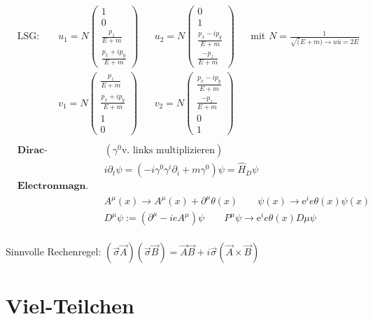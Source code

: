 \documentclass[10pt,a4paper,notitlepage]{scrartcl}
\begin{document}
\begin{align*}
    &\text{LSG: } && u_1 = N \begin{pmatrix} 1 \\ 0 \\ \frac{p_z}{E+m} \\ \frac{p_x+ip_y}{E+m}\end{pmatrix}
    && u_2 = N \begin{pmatrix} 0 \\ 1 \\ \frac{p_x-ip_y}{E+m} \\ \frac{-p_z}{E+m}\end{pmatrix}
    && \text{mit } N = \frac{1}{\sqrt(E+m) \to u\overline{u} = 2E}\\
    &&& v_1 = N \begin{pmatrix} \frac{p_z}{E+m} \\ \frac{p_x+ip_y}{E+m} \\1 \\0 \end{pmatrix}
    && v_2 = N \begin{pmatrix} \frac{p_x-ip_y}{E+m} \\ \frac{-p_z}{E+m} \\ 0 \\ 1\end{pmatrix}
    &&\\
\end{align*}
\begin{align*}
    &\textbf{Dirac-Hamiltonian:} && (\gamma^0 \text{v. links multiplizieren}) &&\\
    & && i\partial_t \psi = (-i\gamma^0\gamma^i\partial_i + m \gamma^0)\psi = \hat H_D \psi\\
    & \textbf{Electronmagn. Eichinvarianz:}\\
    &&&A^\mu(x) \to A^\mu(x) + \partial^\mu\theta(x) \qquad \psi(x) \to \text{e}^ie\theta(x)\psi(x)\\
    &&&D^\mu \psi := (\partial^\mu-ieA^\mu)\psi \qquad P^\mu\psi \to \text{e}^ie\theta(x)D\mu \psi\\
\end{align*}

Sinnvolle Rechenregel: $(\vec{\sigma} \vec{A}) (\vec{\sigma} \vec{B}) = \vec{A} \vec{B} + i \vec{\sigma} (\vec{A} \times \vec{B})$

\section*{Viel-Teilchen}
\end{document}
